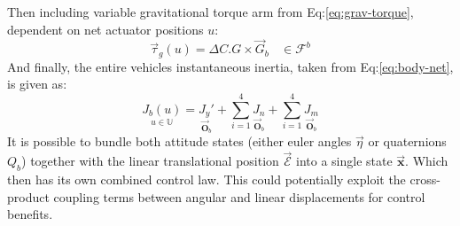 Then including variable gravitational torque arm from Eq:\ref{eq:grav-torque}, dependent on net actuator positions $u$:
\begin{equation}\label{eq:consolidated-grav-torque}
\vec{\tau}_g(u)=\Delta C.G \times\vec{G}_b~~~~\in\mathcal{F}^b
\end{equation}
And finally, the entire vehicles instantaneous inertia, taken from Eq:\ref{eq:body-net}, is given as:
\begin{equation}
\underset{u\in\mathbb{U}}{J_b(u)}=\underset{\vec{\mathbf{O}}_b}{J_{y}'}+\sum_{i=1}^{4} \underset{\vec{\mathbf{O}}_b}{J_{n}}+\sum_{i=1}^{4} \underset{\vec{\mathbf{O}}_b}{J_{m}}
\end{equation}
It is possible to bundle both attitude states (either euler angles $\vec{\eta}$ or quaternions $Q_b$) together with the linear translational position $\vec{\mathcal{E}}$ into a single state $\vec{\mathbf{x}}$. Which then has its own combined control law. This could potentially exploit the cross-product coupling terms between angular and linear displacements for control benefits.